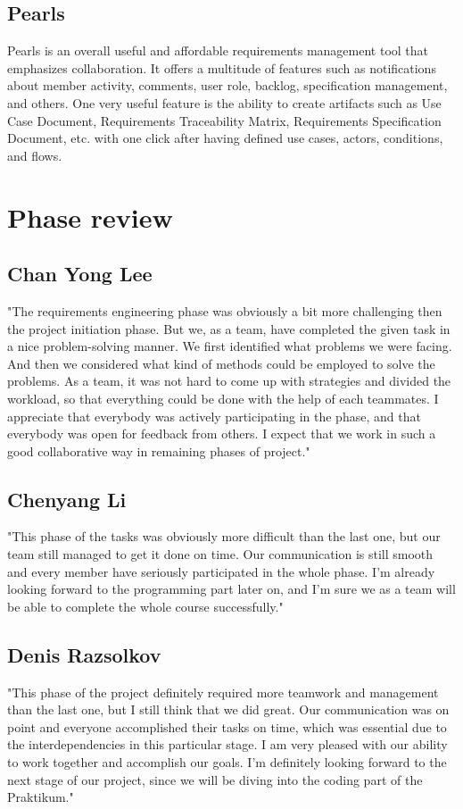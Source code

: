 \documentclass{article}
\begin{document}
\subsection{Pearls}
    Pearls is an overall useful and affordable requirements management tool that emphasizes collaboration. It offers a multitude of features such as
    notifications about member activity, comments, user role, backlog, specification management, and others. One very useful feature is the ability to create artifacts such as Use Case Document, Requirements Traceability Matrix, Requirements Specification Document, etc. with one click after having defined use cases, actors, conditions, and flows.

\section{Phase review}

\subsection{Chan Yong Lee}
"The requirements engineering phase was obviously a bit more challenging then the project initiation phase. But we, as a team, have completed the given task in a nice problem-solving manner. We first identified what problems we were facing. And then we considered what kind of methods could be employed to solve the problems. As a team, it was not hard to come up with strategies and divided the workload, so that everything could be done with the help of each teammates. I appreciate that everybody was actively participating in the phase, and that everybody was open for feedback from others. I expect that we work in such a good collaborative way in remaining phases of project." 

\subsection{Chenyang Li}
"This phase of the tasks was obviously more difficult than the last one, but our team still managed to get it done on time. Our communication is still smooth and every member have seriously participated in the whole phase. I'm already looking forward to the programming part later on, and I'm sure we as a team will be able to complete the whole course successfully."

\subsection{Denis Razsolkov}
"This phase of the project definitely required more teamwork and management than the last one, but I still think that we did great. Our communication was on point and everyone accomplished their tasks on time, which was essential due to the interdependencies in this particular stage. I am very pleased with our ability to work together and accomplish our goals. I'm definitely looking forward to the next stage of our project, since we will be diving into the coding part of the Praktikum."
\end{document}
